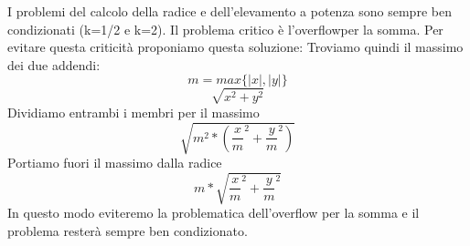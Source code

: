 I problemi del calcolo della radice e dell'elevamento a potenza sono sempre ben condizionati (k=1/2 e k=2).  Il problema critico è l'overflowper la somma. Per evitare questa criticità proponiamo questa soluzione:
Troviamo quindi il massimo dei due addendi:\\
\[
m = max\{|x|,|y|\} 
\]
\[
\sqrt{x^2 + y^2}
\]
Dividiamo entrambi i membri per il massimo
\[
\sqrt{m^2*(\frac{x}{m}^2 + \frac{y}{m}^2)}
\]
Portiamo fuori il massimo dalla radice
\[
m*\sqrt{\frac{x}{m}^2 + \frac{y}{m}^2}
\]
In questo modo eviteremo la problematica dell'overflow per la somma e il problema resterà sempre ben condizionato.